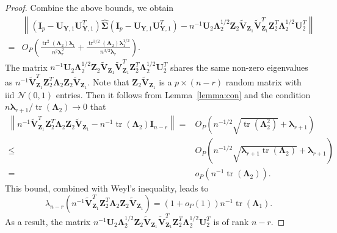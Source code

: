 \documentclass[12pt]{article} %
\DeclareMathOperator{\mytr}{tr}
\newcommand{\bZ}{\mathbf{Z}}
\newcommand{\bY}{\mathbf{Y}}
\newcommand{\bI}{\mathbf{I}}
\newcommand{\bU}{\mathbf{U}}
\newcommand{\bV}{\mathbf{V}}
\newcommand{\bfsym}[1]{\ensuremath{\boldsymbol{#1}}}
\def\blambda {\bfsym {\lambda}}
\def\bLambda {\bfsym {\Lambda}}
\def\bSigma {\bfsym {\Sigma}}
\theoremstyle{definition}
\begin{document}
\begin{appendices}
\begin{proof}
    Combine the above bounds, we obtain
    \begin{equation}\label{haoqilai1}
        \begin{split}
             &\left\|(\bI_p -\bU_{\bY,1}\bU_{\bY,1}^T)\hat{\bSigma}(\bI_p -\bU_{\bY,1}\bU_{\bY,1}^T)
             -
         n^{-1}\bU_2 \bLambda_2^{1/2} \bZ_2 \tilde{\bV}_{\bZ_1}\tilde{\bV}_{\bZ_1}^T  \bZ_2^T \bLambda_2^{1/2} \bU_2^T
             \right\|
             \\
             =&
             O_P\left(
                    \frac{\mytr^2(\bLambda_2)\blambda_1}{n^2 \blambda_r^2}
                 +
                 \frac{\mytr^{3/2}(\bLambda_2)\blambda_1^{1/2}}{n^{3/2}\blambda_r}
                \right).
        \end{split}
    \end{equation}
    The matrix $n^{-1}\bU_2 \bLambda_2^{1/2} \bZ_2 \tilde{\bV}_{\bZ_1}\tilde{\bV}_{\bZ_1}^T  \bZ_2^T \bLambda_2^{1/2} \bU_2^T$ shares the same non-zero eigenvalues as $n^{-1} \tilde{\bV}_{\bZ_1}^T\bZ_2^T\bLambda_2 \bZ_2 \tilde{\bV}_{\bZ_1}$.
    Note that $\bZ_{2}\tilde{\bV}_{\bZ_1}$ is a $p\times (n-r)$ random matrix with iid $\mathcal{N}(0,1)$ entries.
    Then it follows from Lemma~\ref{lemma:con} and the condition $n\blambda_{r+1}/\mytr(\bLambda_2)\to 0$ that
    \begin{equation*}
        \begin{split}
        \left\|
        n^{-1} \tilde{\bV}_{\bZ_1}^T\bZ_2^T\bLambda_2 \bZ_2 \tilde{\bV}_{\bZ_1}-n^{-1}\mytr(\bLambda_2)\bI_{n-r}
        \right\|
        =&O_P\left(n^{-1/2}\sqrt{\mytr(\bLambda_2^2)}+\blambda_{r+1}\right)
        \\
        \leq &
        O_P\left(n^{-1/2}\sqrt{\blambda_{r+1}\mytr(\bLambda_2)}+\blambda_{r+1}\right)
        \\
        =& o_P\left(n^{-1}\mytr(\bLambda_2)\right).
        \end{split}
    \end{equation*}
    This bound, combined with Weyl's inequality, leads to
    \begin{equation}\label{haoqilai2}
        \lambda_{n-r}\left(
            n^{-1} \tilde{\bV}_{\bZ_1}^T\bZ_2^T\bLambda_2 \bZ_2 \tilde{\bV}_{\bZ_1}   
        \right)
        =(1+o_P(1))n^{-1}\mytr(\bLambda_1).
    \end{equation}
    As a result, the matrix $n^{-1}\bU_2 \bLambda_2^{1/2} \bZ_2 \tilde{\bV}_{\bZ_1}\tilde{\bV}_{\bZ_1}^T  \bZ_2^T \bLambda_2^{1/2} \bU_2^T$ is of rank $n-r$.

\end{proof}
\end{appendices}
\end{document}
